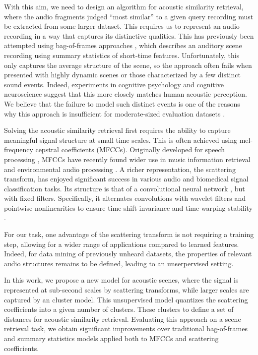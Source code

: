 \documentclass[smallextended]{svjour3}
\begin{document}
With this aim, we need to design an algorithm for acoustic similarity retrieval, where the audio fragments judged ``most similar'' to a given query recording must be extracted from some larger dataset. This requires us to represent an audio recording in a way that captures its distinctive qualities. This has previously been attempted using bag-of-frames approaches \cite{aucouturier2007bag}, which describes an auditory scene recording using summary statistics of short-time features. Unfortunately, this only captures the average structure of the scene, so the approach often fails when presented with highly dynamic scenes or those characterized by a few distinct sound events. Indeed, experiments in cognitive psychology \cite{dubois2006cognitive} and cognitive neuroscience \cite{nelken2004processing} suggest that this more closely matches human acoustic perception. We believe that the failure to model such distinct events is one of the reasons why this approach is insufficient for moderate-sized evaluation datasets \cite{lagrange:hal-01082501}.

Solving the acoustic similarity retrieval first requires the ability to capture meaningful signal structure at small time scales.
This is often achieved using mel-frequency cepstral coefficients (MFCCs).
Originally developed for speech processing \cite{davis-mermelstein}, MFCCs have recently found wider use in music information retrieval \cite{logan} and environmental audio processing \cite{aucouturier2007bag}.
A richer representation, the scattering transform, has enjoyed significant success in various audio \cite{Anden2014} and biomedical \cite{chudacek} signal classification tasks.
Its structure is that of a convolutional neural network \cite{lee,lostanlen-deep-spiral,soundnet,arandjelovic-zisserman}, but with fixed filters.
Specifically, it alternates convolutions with wavelet filters and pointwise nonlinearities to ensure time-shift invariance and time-warping stability \cite{Mallat2012}.

For our task, one advantage of the scattering transform is not requiring a training step, allowing for a wider range of applications compared to learned features. Indeed, for data mining of previously unheard datasets, the properties of relevant audio structures remains to be defined, leading to an unserpervised setting.

In this work, we propose a new model for acoustic scenes, where the signal is represented at sub-second scales by scattering transforms, while larger scales are captured by an cluster model. This unsupervised model quantizes the scattering coefficients into a given number of clusters. These clusters to define a set of distances for acoustic similarity retrieval. Evaluating this approach on a scene retrieval task, we obtain significant improvements over traditional bag-of-frames and summary statistics models applied both to MFCCs and scattering coefficients.
\end{document}

